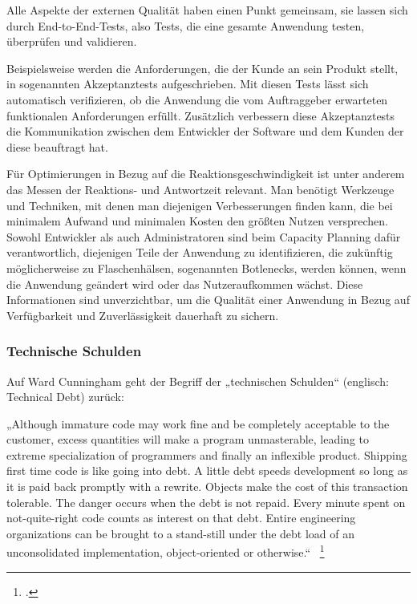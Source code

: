 Alle Aspekte der externen Qualität haben einen Punkt gemeinsam, sie lassen sich durch End-to-End-Tests, also Tests, die eine gesamte Anwendung testen, überprüfen und validieren.

Beispielsweise werden die Anforderungen, die der Kunde an sein Produkt stellt, in sogenannten Akzeptanztests aufgeschrieben. Mit diesen Tests lässt sich automatisch verifizieren, ob die Anwendung die vom Auftraggeber erwarteten funktionalen Anforderungen erfüllt. Zusätzlich verbessern diese Akzeptanztests die Kommunikation zwischen dem Entwickler der Software und dem Kunden der diese beauftragt hat.

Für Optimierungen in Bezug auf die Reaktionsgeschwindigkeit ist unter anderem das Messen der Reaktions- und Antwortzeit relevant. Man benötigt Werkzeuge und Techniken, mit denen man diejenigen 
Verbesserungen finden kann, die bei minimalem Aufwand und minimalen Kosten den größten Nutzen versprechen. Sowohl Entwickler als auch Administratoren sind beim Capacity Planning 
dafür verantwortlich, diejenigen Teile der Anwendung zu identifizieren, die zukünftig möglicherweise zu Flaschenhälsen, sogenannten Botlenecks, werden können, wenn die Anwendung geändert wird 
oder das Nutzeraufkommen wächst. Diese Informationen sind unverzichtbar, um die Qualität einer Anwendung in Bezug auf Verfügbarkeit und Zuverlässigkeit dauerhaft zu sichern.


\subsubsection{Technische Schulden}
Auf Ward Cunningham geht der Begriff der „technischen Schulden“ (englisch: Technical Debt) zurück:

„Although immature code may work fine and be completely acceptable to the customer,
excess quantities will make a program unmasterable, leading to extreme specialization 
of programmers and finally an inflexible product. Shipping first time code is
like going into debt. A little debt speeds development so long as it is paid back promptly
with a rewrite. Objects make the cost of this transaction tolerable. The danger occurs
when the debt is not repaid. Every minute spent on not-quite-right code counts as interest
on that debt. Entire engineering organizations can be brought to a stand-still 
under the debt load of an unconsolidated implementation, object-oriented or otherwise.“ ~\footcite[Vgl.]{website:ward:cunningham} %

